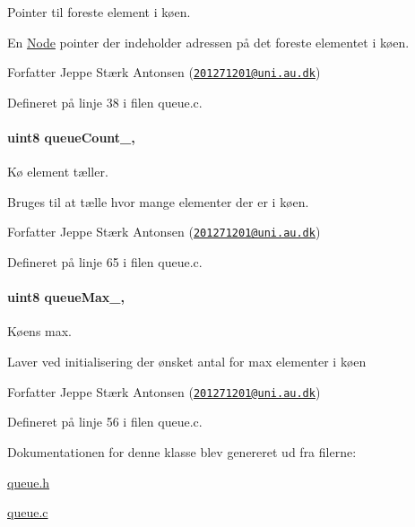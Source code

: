 Pointer til foreste element i køen. 

En \hyperlink{queue_8c_struct_node}{Node} pointer der indeholder adressen på det foreste elementet i køen.

\begin{DoxyAuthor}{Forfatter}
Jeppe Stærk Antonsen (\href{mailto:201271201@uni.au.dk}{\tt 201271201@uni.\+au.\+dk}) 
\end{DoxyAuthor}


Defineret på linje 38 i filen queue.\+c.

\paragraph[{\texorpdfstring{queue\+Count\+\_\+}{queueCount_}}]{\setlength{\rightskip}{0pt plus 5cm}uint8 queue\+Count\+\_\+\hspace{0.3cm}{\ttfamily [static]}, {\ttfamily [private]}}\hypertarget{class_queue_ad260f9ccca00e80d161bbf3e70c3ffa6}{}\label{class_queue_ad260f9ccca00e80d161bbf3e70c3ffa6}


Kø element tæller. 

Bruges til at tælle hvor mange elementer der er i køen.

\begin{DoxyAuthor}{Forfatter}
Jeppe Stærk Antonsen (\href{mailto:201271201@uni.au.dk}{\tt 201271201@uni.\+au.\+dk}) 
\end{DoxyAuthor}


Defineret på linje 65 i filen queue.\+c.

\paragraph[{\texorpdfstring{queue\+Max\+\_\+}{queueMax_}}]{\setlength{\rightskip}{0pt plus 5cm}uint8 queue\+Max\+\_\+\hspace{0.3cm}{\ttfamily [static]}, {\ttfamily [private]}}\hypertarget{class_queue_acb6b6e88c9e4d12839594b31e6ff7c5a}{}\label{class_queue_acb6b6e88c9e4d12839594b31e6ff7c5a}


Køens max. 

Laver ved initialisering der ønsket antal for max elementer i køen

\begin{DoxyAuthor}{Forfatter}
Jeppe Stærk Antonsen (\href{mailto:201271201@uni.au.dk}{\tt 201271201@uni.\+au.\+dk}) 
\end{DoxyAuthor}


Defineret på linje 56 i filen queue.\+c.



Dokumentationen for denne klasse blev genereret ud fra filerne\+:\begin{DoxyCompactItemize}
\item 
\hyperlink{queue_8h}{queue.\+h}\item 
\hyperlink{queue_8c}{queue.\+c}\end{DoxyCompactItemize}
